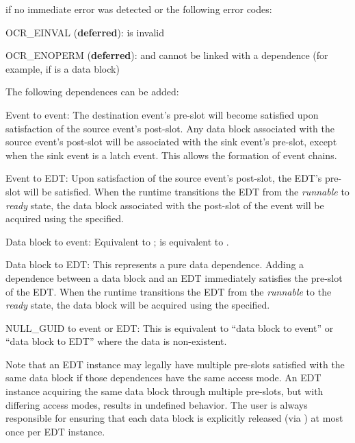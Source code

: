  if no immediate error was detected or the following error codes:
\begin{DoxyItemize}
\item OCR\_EINVAL ({\bf deferred}):  is invalid
\item OCR\_ENOPERM ({\bf deferred}):  and  cannot be linked with
  a dependence (for example, if  is a data block)
\end{DoxyItemize}

\descr
The following dependences can be added:
\begin{DoxyItemize}
\item Event to event: The destination event's pre-slot will become satisfied
  upon satisfaction of the source event's post-slot. Any data block associated
  with the source event's post-slot will be associated with the sink event's pre-slot,
  except when the sink event is a latch event. This allows the formation of event chains.
\item Event to EDT: Upon satisfaction of the source event's post-slot, the EDT's
  pre-slot will be satisfied. When the runtime transitions the EDT from the
  \emph{runnable} to \emph{ready} state, the data block associated with the
  post-slot of the event will be acquired using the  specified.
\item Data block to event: Equivalent to \hyperlink{func_ocrEventSatisfySlot}{
  };  is
  equivalent to .
\item Data block to EDT: This represents a pure data dependence. Adding a
  dependence between a data block and an EDT immediately satisfies the pre-slot
  of the EDT. When the runtime transitions the EDT from the \emph{runnable}
  to the \emph{ready} state, the data block will be acquired using the
   specified.
\item NULL\_GUID to event or EDT: This is equivalent to ``data block to event''
  or ``data block to EDT'' where the data is non-existent.
\end{DoxyItemize}

Note that an EDT instance may legally have multiple pre-slots satisfied with the same
data block if those dependences have the same access mode. An EDT instance acquiring the
same data block through multiple pre-slots, but with differing access modes, results in
undefined behavior. The user is always responsible for ensuring that each data block is
explicitly released (via \hyperlink{func_ocrDbRelease}{}) at most once
per EDT instance.

